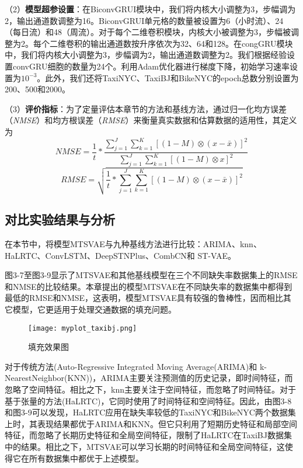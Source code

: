 （2）\textbf{模型超参设置}：在BiconvGRUI模块中，我们将内核大小调整为3，步幅调为2，输出通道数调整为16。BiconvGRUI单元格的数量被设置为6（小时流）、24（每日流）和48（周流）。对于每个二维卷积模块，内核大小被调整为3，步幅被调整为2。每个二维卷积的输出通道数按升序依次为32、64和128。在congGRU模块中，我们将内核大小调整为3，步幅调为2，输出通道数调整为2。我们根据经验设置convGRU细胞的数量为24个。利用Adam优化器进行梯度下降，初始学习速率设置为$10^{-3}$。此外，我们还将TaxiNYC、TaxiBJ和BikeNYC的epoch总数分别设置为200、500和2000。

（3）\textbf{评价指标}：为了定量评估本章节的方法和基线方法，通过归一化均方误差（\textit{NMSE}）和均方根误差（\textit{RMSE}）来衡量真实数据和估算数据的适用性，其定义为
\begin{equation}
NMSE=\frac{1}{t}*\frac{\sum_{j=1}^J\sum_{k=1}^K[(1-M)\otimes(x-\bar{x})]^2}{\sum_{j=1}^J\sum_{k=1}^K[(1-M)\otimes x]^2}
\end{equation}
\begin{equation}
RMSE=\sqrt{\frac{1}{t}*{\sum_{j=1}^J\sum_{k=1}^K[(1-M)\otimes(x-\bar{x})]^2}}
\end{equation}

\subsection{对比实验结果与分析}
在本节中，将模型MTSVAE与九种基线方法进行比较：ARIMA\cite{3}、knn\cite{19}、HaLRTC\cite{4}、ConvLSTM\cite{20}、DeepSTNPlus\cite{5}、CombCN\cite{21}和 ST-VAE\cite{8}。

图3-7至图3-9显示了MTSVAE和其他基线模型在三个不同缺失率数据集上的RMSE和NMSE的比较结果。本章提出的模型MTSVAE在不同缺失率的数据集中都得到最低的RMSE和NMSE，这表明，模型MTSVAE具有较强的鲁棒性，因而相比其它模型，它更适用于处理交通数据的填充问题。

\begin{figure}[htbp] 
\centering
\texttt{[image: myplot\_taxibj.png]}
\vspace{-1em}
\caption{填充效果图 \label{impute}}
\end{figure}

对于传统方法(Auto-Regressive Integrated Moving Average(ARIMA)和 k-NearestNeighbor(KNN))，ARIMA主要关注预测值的历史记录，即时间特征，而忽略了空间特征。相比之下，knn主要关注于空间特征，而忽略了时间特征。对于基于张量的方法(HaLRTC)，它同时使用了时间特征和空间特征。因此，由图3-8和图3-9可以发现，HaLRTC应用在缺失率较低的TaxiNYC和BikeNYC两个数据集上时，其表现结果都优于ARIMA和KNN。但它只利用了短期历史特征和局部空间特征，而忽略了长期历史特征和全局空间特征，限制了HaLRTC在TaxiBJ数据集中的结果。相比之下，MTSVAE可以学习长期的时间特征和全局空间特征，这使得它在所有数据集中都优于上述模型。

